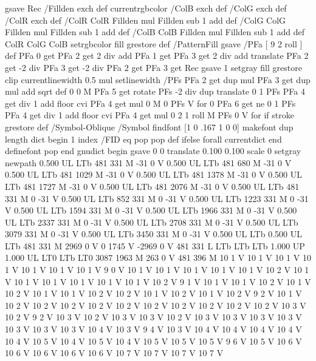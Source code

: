 {{{  gsave Rec
  /Fillden exch def
  currentrgbcolor
  /ColB exch def /ColG exch def /ColR exch def
  /ColR ColR Fillden mul Fillden sub 1 add def
  /ColG ColG Fillden mul Fillden sub 1 add def
  /ColB ColB Fillden mul Fillden sub 1 add def
  ColR ColG ColB setrgbcolor
  fill grestore } def
%
%
/PatternFill { gsave /PFa [ 9 2 roll ] def
    PFa 0 get PFa 2 get 2 div add PFa 1 get PFa 3 get 2 div add translate
    PFa 2 get -2 div PFa 3 get -2 div PFa 2 get PFa 3 get Rec
    gsave 1 setgray fill grestore clip
    currentlinewidth 0.5 mul setlinewidth
    /PFs PFa 2 get dup mul PFa 3 get dup mul add sqrt def
    0 0 M PFa 5 get rotate PFs -2 div dup translate
	0 1 PFs PFa 4 get div 1 add floor cvi
	{ PFa 4 get mul 0 M 0 PFs V } for
    0 PFa 6 get ne {
	0 1 PFs PFa 4 get div 1 add floor cvi
	{ PFa 4 get mul 0 2 1 roll M PFs 0 V } for
    } if
    stroke grestore } def
%
/Symbol-Oblique /Symbol findfont [1 0 .167 1 0 0] makefont
dup length dict begin {1 index /FID eq {pop pop} {def} ifelse} forall
currentdict end definefont pop
end
gnudict begin
gsave
0 0 translate
0.100 0.100 scale
0 setgray
newpath
0.500 UL
LTb
481 331 M
-31 0 V
0.500 UL
LTb
481 680 M
-31 0 V
0.500 UL
LTb
481 1029 M
-31 0 V
0.500 UL
LTb
481 1378 M
-31 0 V
0.500 UL
LTb
481 1727 M
-31 0 V
0.500 UL
LTb
481 2076 M
-31 0 V
0.500 UL
LTb
481 331 M
0 -31 V
0.500 UL
LTb
852 331 M
0 -31 V
0.500 UL
LTb
1223 331 M
0 -31 V
0.500 UL
LTb
1594 331 M
0 -31 V
0.500 UL
LTb
1966 331 M
0 -31 V
0.500 UL
LTb
2337 331 M
0 -31 V
0.500 UL
LTb
2708 331 M
0 -31 V
0.500 UL
LTb
3079 331 M
0 -31 V
0.500 UL
LTb
3450 331 M
0 -31 V
0.500 UL
LTb
0.500 UL
LTb
481 331 M
2969 0 V
0 1745 V
-2969 0 V
481 331 L
LTb
LTb
LTb
1.000 UP
1.000 UL
LT0
LTb
LT0
3087 1963 M
263 0 V
481 396 M
10 1 V
10 1 V
10 1 V
10 1 V
10 1 V
10 1 V
10 1 V
9 0 V
10 1 V
10 1 V
10 1 V
10 1 V
10 1 V
10 2 V
10 1 V
10 1 V
10 1 V
10 1 V
10 1 V
10 1 V
10 2 V
9 1 V
10 1 V
10 1 V
10 2 V
10 1 V
10 2 V
10 1 V
10 1 V
10 2 V
10 2 V
10 1 V
10 2 V
10 1 V
10 2 V
9 2 V
10 1 V
10 2 V
10 2 V
10 2 V
10 2 V
10 2 V
10 2 V
10 2 V
10 2 V
10 2 V
10 2 V
10 3 V
10 2 V
9 2 V
10 3 V
10 2 V
10 3 V
10 3 V
10 2 V
10 3 V
10 3 V
10 3 V
10 3 V
10 3 V
10 3 V
10 3 V
10 4 V
10 3 V
9 4 V
10 3 V
10 4 V
10 4 V
10 4 V
10 4 V
10 4 V
10 5 V
10 4 V
10 5 V
10 4 V
10 5 V
10 5 V
10 5 V
9 6 V
10 5 V
10 6 V
10 6 V
10 6 V
10 6 V
10 6 V
10 7 V
10 7 V
10 7 V
10 7 V
}}
